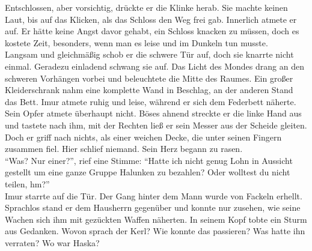 Entschlossen, aber vorsichtig, drückte er die Klinke herab. Sie machte keinen Laut, bis auf das 
Klicken, als das Schloss den Weg frei gab. Innerlich atmete er auf. Er hätte keine Angst davor 
gehabt, ein Schloss knacken zu müssen, doch es kostete Zeit, besonders, wenn man es leise und im 
Dunkeln tun musste.\\
Langsam und gleichmäßig schob er die schwere Tür auf, doch sie knarrte nicht einmal. Geradezu 
einladend schwang sie auf. Das Licht des Mondes drang an den schweren Vorhängen vorbei und 
beleuchtete die Mitte des Raumes. Ein großer Kleiderschrank nahm eine komplette Wand in Beschlag, 
an der anderen Stand das Bett. Imur atmete ruhig und leise, während er sich dem Federbett näherte. 
Sein Opfer atmete überhaupt nicht. Böses ahnend streckte er die linke Hand aus und tastete nach 
ihm, mit der Rechten ließ er sein Messer aus der Scheide gleiten.
Doch er griff nach nichts, als einer weichen Decke, die unter seinen Fingern zusammen fiel.
Hier schlief niemand. Sein Herz begann zu rasen.\\
``Was? Nur einer?'', rief eine Stimme: ``Hatte ich nicht genug Lohn in Aussicht gestellt um eine 
ganze Gruppe Halunken zu bezahlen? Oder wolltest du nicht teilen, hm?''\\
Imur starrte auf die Tür. Der Gang hinter dem Mann wurde von Fackeln erhellt. Sprachlos stand er 
dem Hausherrn gegenüber und konnte nur zusehen, wie seine Wachen sich ihm mit gezückten Waffen 
näherten. In seinem Kopf tobte ein Sturm aus Gedanken. Wovon sprach der Kerl? Wie konnte das 
passieren? Was hatte ihn verraten? Wo war Haska?\\

